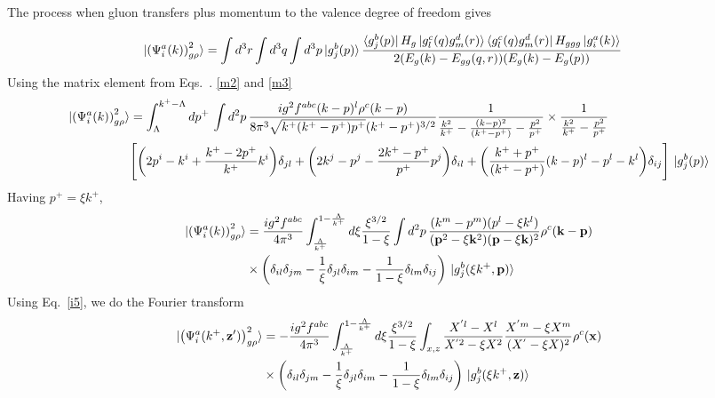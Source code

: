 \documentclass[aps,prd,amsmath,amssymb,nofootinbib]{revtex4-2}
\def\v#1{\mathbf{#1}}
\numberwithin{equation}{section}
\begin{document}
The process when gluon transfers plus momentum to the valence degree of freedom gives 
\begin{figure}[h]
\end{figure}
\begin{align}\label{onegrho2}
  \ket{ \left(\Psi^{a}_{i}(k) \right)^{2}_{g \rho} }%
   & =  \int d^{3}r \int d^{3}q \int d^{3}p
  \ket{g^{b}_{j}(p)}
  \frac{\bra{g^{b}_{j}(p)}H_{g}\ket{g^{c}_{l}(q)g^{d}_{m}(r)}\bra{g^{c}_{l}(q)g^{d}_{m}(r)}H_{ggg}\ket{g^{a}_{i}(k)}}{2(E_{g}(k)-E_{gg}(q,r))(E_{g }(k)-E_{g}(p))}
\end{align}
Using the matrix element from Eqs.~. \eqref{m2} and \eqref{m3}
\begin{align}\label{onegrho22}
\ket{ \left(\Psi^{a}_{i}(k) \right)^{2}_{g \rho} }   &= \int_{\Lambda}^{k^{+}-\Lambda}dp^{+}\,\int d^{2}p\,\frac{ig^{2}f^{abc}(k-p)^{l}\rho^{c}(k-p)}{8\pi^{3}\sqrt{k^{+}(k^{+}-p^{+})p^{+}}(k^{+}-p^{+})^{3/2}}\frac{1}{\frac{k^{2}}{k^{+}}-\frac{(k-p)^{2}}{(k^{+}-p^{+})}-\frac{p^{2}}{p^{+}}}\times \frac{1}{\frac{k^{2}}{k^{+}}-\frac{p^{2}}{p^{+}}}\notag \\ & \Bigg[\bigg(2p^{i}-k^{i}+\frac{k^{+}-2p^{+}}{k^{+}}k^{i}\bigg)\delta_{jl} +\bigg(2k^{j}-p^{j}-\frac{2k^{+}-p^{+}}{p^{+}}p^{j}\bigg)\delta_{il}+\bigg(\frac{k^{+}+p^{+}}{(k^{+}-p^{+})}(k-p)^{l}-p^{l}-k^{l}\bigg)\delta_{ij}\Bigg]\,\ket{g^{b}_{j}(p)}
\end{align}
Having $p^{+} = \xi k^{+}$,
\begin{align}
\ket{ \left(\Psi^{a}_{i}(k) \right)^{2}_{g \rho} }   & = \frac{i g^2 f^{abc}} {4\pi^3} 
   \int_{\frac{\Lambda}{k^+}   }^{ 1- \frac{\Lambda }{k^+} } %
   d \xi 
  \frac{\xi^{3/2}}{1-\xi} 
   \int d^{2}p\,
  \frac{(k^m - p^m) (p^l - \xi k^l)} {(\v{p}^2-\xi \v{k}^2) (\v{p} - \xi \v{k})^2}
   \rho^c(\v{k}-\v{p})
  \notag \\ & \times 
  \left(\delta_{il} \delta_{jm} - \frac{1}{\xi} \delta_{jl} \delta_{im} - \frac{1}{1-\xi} \delta_{lm}\delta_{ij} \right)\,\ket{g^{b}_{j}(\xi k^+,\v{p})}
\end{align}
Using Eq.~\eqref{i5}, we do the Fourier transform
\begin{align}%
\label{Eq:onegrhoX2}
  \notag
  \ket{ \left(\Psi^{a}_{i}(k^+, \v{z}') \right)^{2}_{g \rho} }%
   &= - \frac{i g^2 f^{abc}} {4\pi^3} 
   \int_{\frac{\Lambda}{k^+}   }^{ 1- \frac{\Lambda }{k^+} } %
   d \xi 
  \frac{\xi^{3/2}}{1-\xi} 
   \int_{x,z}
   \frac{X^{'l} - X^l} {X^{'2} - \xi X^2}
   \frac{X^{'m} -  \xi X^m} {(X^{'} -  \xi X)^2}
   \rho^c(\v{x})
  \notag \\ & \times 
  \left(\delta_{il} \delta_{jm} - \frac{1}{\xi} \delta_{jl} \delta_{im} - \frac{1}{1-\xi} \delta_{lm}\delta_{ij} \right)\,\ket{g^{b}_{j}(\xi k^+,\v{z})}
\end{align}
\end{document}
